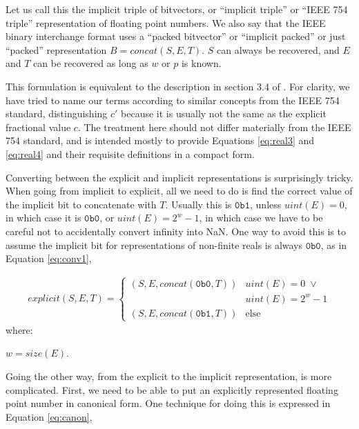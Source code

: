 \documentclass[letterpaper,10pt]{article}
\begin{document}
Let us call this the implicit triple of bitvectors, or ``implicit triple'' or ``IEEE 754 triple'' representation of floating point numbers. We also say that the IEEE binary interchange format uses a ``packed bitvector'' or ``implicit packed'' or just ``packed'' representation $B = concat(S, E, T)$. $S$ can always be recovered, and $E$ and $T$ can be recovered as long as $w$ or $p$ is known. 

This formulation is equivalent to the description in section 3.4 of \cite{ieee754-2008}. For clarity, we have tried to name our terms according to similar concepts from the IEEE 754 standard, distinguishing $c'$ because it is usually not the same as the explicit fractional value $c$. The treatment here should not differ materially from the IEEE 754 standard, and is intended mostly to provide Equations \ref{eq:real3} and \ref{eq:real4} and their requisite definitions in a compact form.

Converting between the explicit and implicit representations is surprisingly tricky. When going from implicit to explicit, all we need to do is find the correct value of the implicit bit to concatenate with $T$. Usually this is $\texttt{0b1}$, unless $uint(E) = 0$, in which case it is $\texttt{0b0}$, or $uint(E) = 2^w - 1$, in which case we have to be careful not to accidentally convert infinity into NaN. One way to avoid this is to assume the implicit bit for representations of non-finite reals is always $\texttt{0b0}$, as in Equation \ref{eq:conv1},

\begin{align} \label{eq:conv1}
 explicit(S, E, T) =
 \begin{cases}
  (S, E, concat(\texttt{0b0}, T)) & uint(E) = 0 \; \lor \\
                                  & uint(E) = 2^w - 1   \\
  (S, E, concat(\texttt{0b1}, T)) & \text{else}
 \end{cases}
\end{align}
where:
\begin{description}
 \item $w = size(E)$.
\end{description}

Going the other way, from the explicit to the implicit representation, is more complicated. First, we need to be able to put an explicitly represented floating point number in canonical form. One technique for doing this is expressed in Equation \ref{eq:canon},
\end{document}
